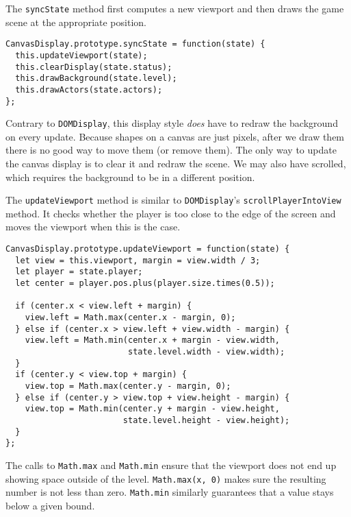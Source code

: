 The \lstinline`syncState` method first computes a new viewport and then draws the game scene at the appropriate position.

\begin{lstlisting}
CanvasDisplay.prototype.syncState = function(state) {
  this.updateViewport(state);
  this.clearDisplay(state.status);
  this.drawBackground(state.level);
  this.drawActors(state.actors);
};
\end{lstlisting}
\noindent{}

Contrary to \lstinline`DOMDisplay`, this display style \emph{does} have to redraw the background on every update. Because shapes on a canvas are just pixels, after we draw them there is no good way to move them (or remove them). The only way to update the canvas display is to clear it and redraw the scene. We may also have scrolled, which requires the background to be in a different position.

The \lstinline`updateViewport` method is similar to \lstinline`DOMDisplay`'s \lstinline`scrollPlayerIntoView` method. It checks whether the player is too close to the edge of the screen and moves the viewport when this is the case.

\begin{lstlisting}
CanvasDisplay.prototype.updateViewport = function(state) {
  let view = this.viewport, margin = view.width / 3;
  let player = state.player;
  let center = player.pos.plus(player.size.times(0.5));

  if (center.x < view.left + margin) {
    view.left = Math.max(center.x - margin, 0);
  } else if (center.x > view.left + view.width - margin) {
    view.left = Math.min(center.x + margin - view.width,
                         state.level.width - view.width);
  }
  if (center.y < view.top + margin) {
    view.top = Math.max(center.y - margin, 0);
  } else if (center.y > view.top + view.height - margin) {
    view.top = Math.min(center.y + margin - view.height,
                        state.level.height - view.height);
  }
};
\end{lstlisting}
\noindent{}

The calls to \lstinline`Math.max` and \lstinline`Math.min` ensure that the viewport does not end up showing space outside of the level. \lstinline`Math.max(x, 0)` makes sure the resulting number is not less than zero. \lstinline`Math.min` similarly guarantees that a value stays below a given bound.

